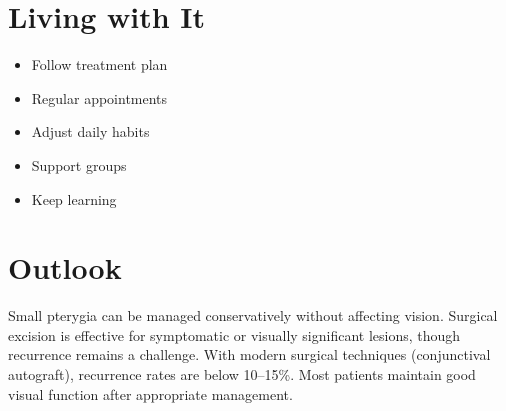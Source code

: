 \section{Living with It}
\begin{itemize}[noitemsep]
  \item Follow treatment plan
  \item Regular appointments
  \item Adjust daily habits
  \item Support groups
  \item Keep learning
\end{itemize}

\section{Outlook}
Small pterygia can be managed conservatively without affecting vision. Surgical excision is effective for symptomatic or visually significant lesions, though recurrence remains a challenge. With modern surgical techniques (conjunctival autograft), recurrence rates are below 10--15\%. Most patients maintain good visual function after appropriate management.
